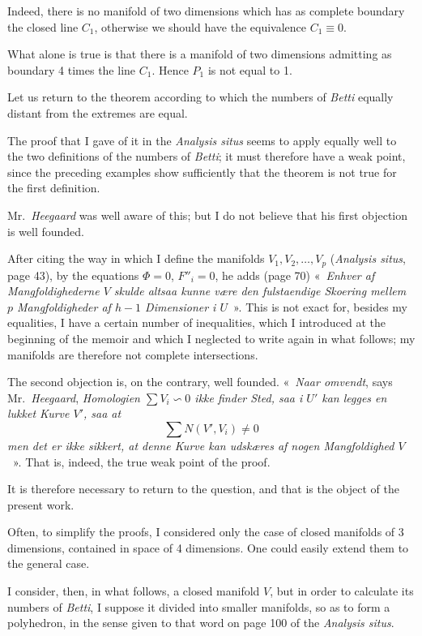 \documentclass{article}
\begin{document}
Indeed, there is no manifold of two dimensions which has as complete boundary the closed line $C_{1}$, otherwise we should have the equivalence $C_{1} \equiv 0$.

What alone is true is that there is a manifold of two dimensions admitting as boundary 4 times the line $C_{1}$. Hence $P_{1}$ is not equal to 1.

Let us return to the theorem according to which the numbers of \emph{Betti} equally distant from the extremes are equal.

The proof that I gave of it in the \emph{Analysis situs} seems to apply equally well to the two definitions of the numbers of \emph{Betti}; it must therefore have a weak point, since the preceding examples show sufficiently that the theorem is not true for the first definition.

Mr.~\emph{Heegaard} was well aware of this; but I do not believe that his first objection is well founded.

After citing the way in which I define the manifolds $V_{1}, V_{2}, \ldots, V_{p}$ (\emph{Analysis situs}, page 43), by the equations $\Phi = 0$, $F''_{i} = 0$, he adds (page 70) «~\emph{Enhver af Mangfoldighederne $V$ skulde altsaa kunne være den fulstaendige Skoering mellem $p$ Mangfoldigheder af $h - 1$ Dimensioner i $U$}~». This is not exact for, besides my equalities, I have a certain number of inequalities, which I introduced at the beginning of the memoir and which I neglected to write again in what follows; my manifolds are therefore not complete intersections.

The second objection is, on the contrary, well founded. «~\emph{Naar omvendt}, says Mr.~\emph{Heegaard}, \emph{Homologien $\displaystyle\sum V_{i} \backsim 0$ ikke finder Sted, saa i $U'$ kan legges en lukket Kurve $V'$, saa at}
\[ \sum N(V', V_{i}) \neq 0 \]
\emph{men det er ikke sikkert, at denne Kurve kan udskæres af nogen Mangfoldighed $V$}~». That is, indeed, the true weak point of the proof.


It is therefore necessary to return to the question, and that is the object of the present work.

Often, to simplify the proofs, I considered only the case of closed manifolds of 3 dimensions, contained in space of 4 dimensions. One could easily extend them to the general case.

I consider, then, in what follows, a closed manifold $V$, but in order to calculate its numbers of \emph{Betti}, I suppose it divided into smaller manifolds, so as to form a polyhedron, in the sense given to that word on page 100 of the \emph{Analysis situs}.
\end{document}
